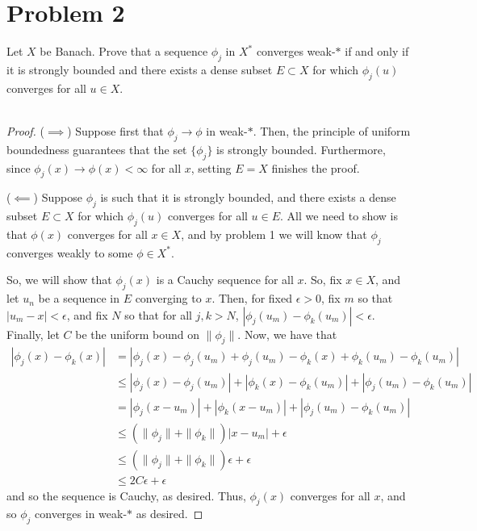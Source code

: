 \documentclass[fontsize=11pt]{scrartcl} %
\numberwithin{equation}{section} %
\numberwithin{figure}{section} %
\numberwithin{table}{section} %
\begin{document}
\section{Problem 2}
Let $X$ be Banach. Prove that a sequence $\phi_j$ in $X^*$ converges weak-$*$ if
and only if it is strongly bounded and there exists a dense subset $E\subset X$
for which $\phi_j(u)$ converges for all $u\in X$.
\\
\\
\begin{proof}
    ($\implies$)
    Suppose first that $\phi_j\to\phi$ in weak-$*$. Then, the principle of
    uniform boundedness guarantees that the set $\{\phi_j\}$ is strongly bounded.
    Furthermore, since $\phi_j(x)\to\phi(x) < \infty$ for all $x$, setting $E=X$
    finishes the proof.

    ($\impliedby$)
    Suppose $\phi_j$ is such that it is strongly bounded, and there exists a
    dense subset $E\subset X$ for which $\phi_j(u)$ converges for all $u\in E$.
    All we need to show is that $\phi(x)$ converges for all $x\in X$, and by
    problem 1 we will know that $\phi_j$ converges weakly to some $\phi\in X^*$.
    
    So, we will show that $\phi_j(x)$ is a Cauchy sequence for all $x$. So, fix
    $x\in X$, and let $u_n$ be a sequence in $E$ converging to $x$. Then, for
    fixed $\epsilon>0$, fix $m$ so that $|u_m - x|<\epsilon$, and fix $N$ so
    that for all $j,k > N$, $|\phi_j(u_m)-\phi_k(u_m)|<\epsilon$. Finally, let
    $C$ be the uniform bound on $\|\phi_j\|$. Now, we have
    that
    \[
\begin{aligned}
    |\phi_j(x) - \phi_k(x)| &= |\phi_j(x)-\phi_j(u_m)+\phi_j(u_m) -\phi_k(x) +
    \phi_k(u_m) - \phi_k(u_m)|\\
    &\leq |\phi_j(x)-\phi_j(u_m)| + |\phi_k(x)-\phi_k(u_m)| + |\phi_j(u_m) -
    \phi_k(u_m)|\\
    &= |\phi_j(x-u_m)| + |\phi_k(x-u_m)| + |\phi_j(u_m)-\phi_k(u_m)|\\
&\leq (\|\phi_j\| + \|\phi_k\|)|x-u_m| + \epsilon\\
&\leq (\|\phi_j\| + \|\phi_k\|)\epsilon + \epsilon\\
&\leq 2C\epsilon + \epsilon
\end{aligned}
    \]
    and so the sequence is Cauchy, as desired. Thus, $\phi_j(x)$ converges for
    all $x$, and so $\phi_j$ converges in weak-$*$ as desired.
\end{proof}

\newpage
\end{document}
